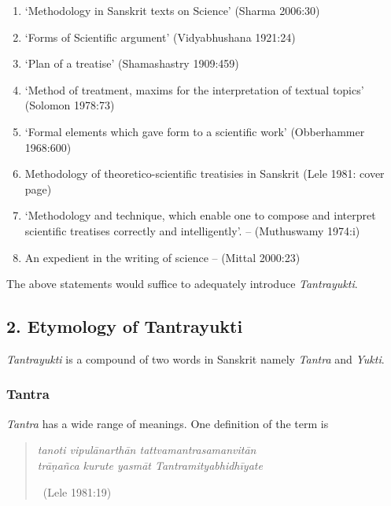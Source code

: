 \begin{enumerate}[{\rm i)}]
\itemsep=0pt
\item ‘Methodology in Sanskrit texts on Science’ (Sharma 2006:30)

 \item ‘Forms of Scientific argument’ (Vidyabhushana 1921:24) 

 \item ‘Plan of a treatise’ (Shamashastry 1909:459)

 \item ‘Method of treatment, maxims for the interpretation of textual topics’ (Solomon 1978:73) 

 \item ‘Formal elements which gave form to a scientific work’ (Obberhammer 1968:600)

 \item Methodology of theoretico-scientific treatisies in Sanskrit (Lele 1981: cover page)

 \item ‘Methodology and technique, which enable one to compose and interpret scientific treatises correctly and intelligently’. – (Muthuswamy 1974:i)

 \item An expedient in the writing of science – (Mittal 2000:23)

\end{enumerate}

The above statements would suffice to adequately introduce \textit{Tantrayukti}.


\subsection*{2. Etymology of Tantrayukti}

\textit{Tantrayukti} is a compound of two words in Sanskrit namely \textit{Tantra} and \textit{Yukti}.

\subsubsection*{Tantra}

\textit{Tantra} has a wide range of meanings. One definition of the term is

\begin{verse}
\textit{tanoti vipulānarthān tattvamantrasamanvitān }\\\textit{ trāṇañca kurute yasmāt Tantramityabhidhīyate }

~\hfill (Lele 1981:19)
\end{verse}

